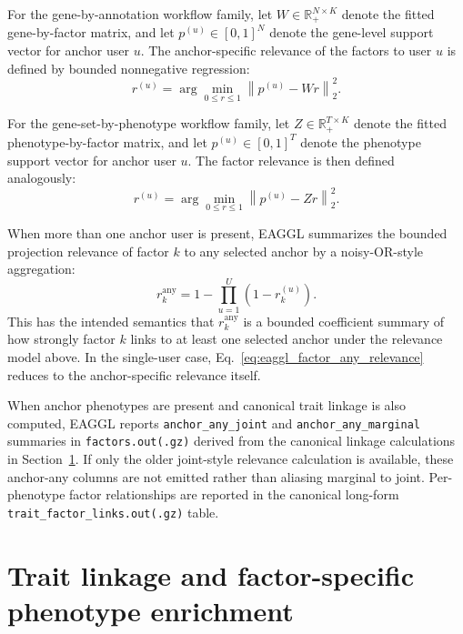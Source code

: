 \documentclass[11pt]{article}
\begin{document}
For the gene-by-annotation workflow family, let $W \in \mathbb{R}_+^{N \times K}$ denote the fitted gene-by-factor matrix, and let $p^{(u)} \in [0,1]^N$ denote the gene-level support vector for anchor user $u$. The anchor-specific relevance of the factors to user $u$ is defined by bounded nonnegative regression:
\begin{equation}
r^{(u)}
=
\arg\min_{0 \le r \le 1}
\left\|
p^{(u)} - W r
\right\|_2^2.
\label{eq:eaggl_factor_relevance_gene}
\end{equation}

For the gene-set-by-phenotype workflow family, let $Z \in \mathbb{R}_+^{T \times K}$ denote the fitted phenotype-by-factor matrix, and let $p^{(u)} \in [0,1]^T$ denote the phenotype support vector for anchor user $u$. The factor relevance is then defined analogously:
\begin{equation}
r^{(u)}
=
\arg\min_{0 \le r \le 1}
\left\|
p^{(u)} - Z r
\right\|_2^2.
\label{eq:eaggl_factor_relevance_pheno}
\end{equation}

When more than one anchor user is present, EAGGL summarizes the bounded projection relevance of factor $k$ to any selected anchor by a noisy-OR-style aggregation:
\begin{equation}
r_k^{\mathrm{any}}
=
1 -
\prod_{u=1}^U
\left(
1 - r_k^{(u)}
\right).
\label{eq:eaggl_factor_any_relevance}
\end{equation}
This has the intended semantics that $r_k^{\mathrm{any}}$ is a bounded coefficient summary of how strongly factor $k$ links to at least one selected anchor under the relevance model above. In the single-user case, Eq.~\eqref{eq:eaggl_factor_any_relevance} reduces to the anchor-specific relevance itself.

When anchor phenotypes are present and canonical trait linkage is also computed, EAGGL reports \texttt{anchor\_any\_joint} and \texttt{anchor\_any\_marginal} summaries in \texttt{factors.out(.gz)} derived from the canonical linkage calculations in Section~\ref{sec:postfactor_revised}. If only the older joint-style relevance calculation is available, these anchor-any columns are not emitted rather than aliasing marginal to joint. Per-phenotype factor relationships are reported in the canonical long-form \texttt{trait\_factor\_links.out(.gz)} table.

\section{Trait linkage and factor-specific phenotype enrichment}
\label{sec:postfactor_revised}
\end{document}
